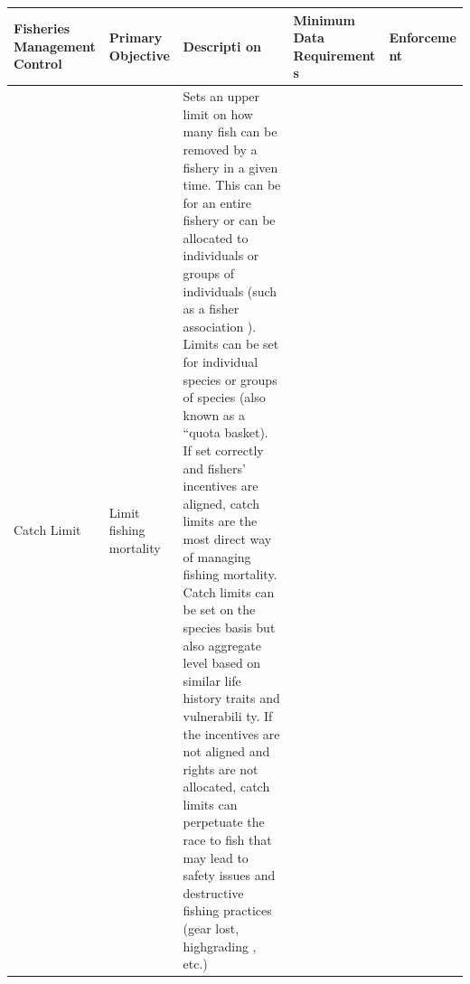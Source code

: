 \documentclass[]{book}
\begin{document}
\begin{longtable}[]{@{}lllll@{}}
\toprule
\begin{minipage}[b]{0.17\columnwidth}\raggedright\strut
\textbf{Fisheries Management Control}\strut
\end{minipage} & \begin{minipage}[b]{0.17\columnwidth}\raggedright\strut
\textbf{Primary Objective}\strut
\end{minipage} & \begin{minipage}[b]{0.17\columnwidth}\raggedright\strut
\textbf{Descripti on}\strut
\end{minipage} & \begin{minipage}[b]{0.17\columnwidth}\raggedright\strut
\textbf{Minimum Data Requirement s}\strut
\end{minipage} & \begin{minipage}[b]{0.17\columnwidth}\raggedright\strut
\textbf{Enforceme nt}\strut
\end{minipage}\tabularnewline
\midrule
\endhead
\begin{minipage}[t]{0.19\columnwidth}\raggedright\strut
Catch Limit\strut
\end{minipage} & \begin{minipage}[t]{0.19\columnwidth}\raggedright\strut
Limit fishing mortality\strut
\end{minipage} & \begin{minipage}[t]{0.19\columnwidth}\raggedright\strut
Sets an upper limit on how many fish can be removed by a fishery in a
given time. This can be for an entire fishery or can be allocated to
individuals or groups of individuals (such as a fisher association ).
Limits can be set for individual species or groups of species (also
known as a ``quota basket). If set correctly and fishers' incentives are
aligned, catch limits are the most direct way of managing fishing
mortality. Catch limits can be set on the species basis but also
aggregate level based on similar life history traits and vulnerabili ty.
If the incentives are not aligned and rights are not allocated, catch
limits can perpetuate the race to fish that may lead to safety issues
and destructive fishing practices (gear lost, highgrading , etc.)


\end{minipage}
\end{longtable}
\end{document}
